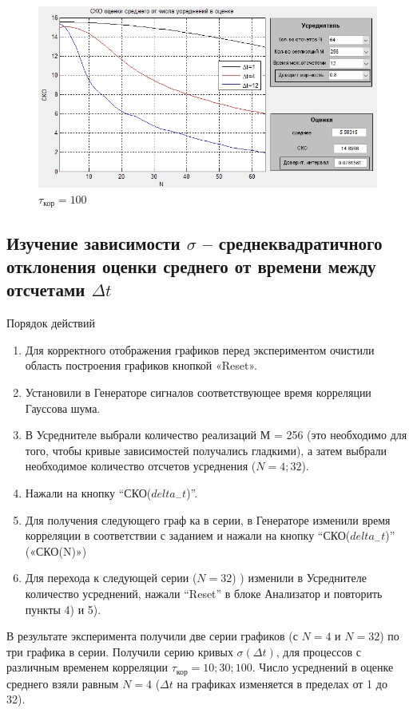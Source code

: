 \begin{figure}[H]
	\centering
	\includegraphics[width=0.85\linewidth]{tasks/task3/realize2}
	\caption*{$\tau_\text{кор} = 100$}
\end{figure}
\subsection[Задание 4]{Изучение зависимости $\sigma$ -- среднеквадратичного отклонения оценки среднего от времени между отсчетами $\Delta t$}
Порядок действий
\begin{enumerate}
	\item Для корректного отображения графиков перед экспериментом очистили область построения графиков кнопкой «Reset».
	\item Установили в Генераторе сигналов соответствующее время корреляции Гауссова шума.
	\item В Усреднителе выбрали количество реализаций М = 256 (это необходимо для того, чтобы кривые зависимостей получались гладкими), а затем выбрали необходимое количество отсчетов усреднения ($N = 4; 32$).
	\item Нажали на кнопку “СКО($delta_{-}t$)”.
	\item Для получения следующего граф ка в серии, в Генераторе изменили время корреляции в соответствии с заданием и нажали на кнопку “СКО($delta_{-}t$)” («СКО(N)»)
	\item Для перехода к следующей серии ($N=32$) ) изменили в Усреднителе количество усреднений, нажали “Reset” в блоке Анализатор и повторить пункты 4) и 5).
\end{enumerate}
В результате эксперимента получили две серии графиков (с $N = 4$ и $N = 32$) по три графика в серии.
Получили серию кривых $\sigma(\Delta t)$, для процессов с различным временем корреляции $\tau_\text{кор}= 10; 30; 100$. Число усреднений в оценке среднего взяли равным $N = 4$ ($\Delta t$ на графиках изменяется в пределах от 1 до 32).
